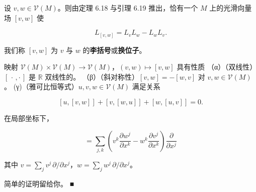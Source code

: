 设 $ v, w \in \mathcal{V}(M) $。则由定理 6.18 与引理 6.19 推出，恰有一个 $ M $ 上的光滑向量场 $ [v, w] $ 使

\begin{equation}
L_{[v, w]} = L_{v} L_{w} - L_{w} L_{v} .\tag{6.33}
\end{equation}

我们称 $ [v, w] $ 为 $ v $ 与 $ w $ 的\textbf{李括号}或\textbf{换位子}。

\begin{proposition}

\begin{subitems}
\item

映射 $ \mathcal{V}(M) \times \mathcal{V}(M) \to \mathcal{V}(M) $，$ (v, w) \mapsto [v, w] $ 具有性质
（α）（双线性）$ [\,\cdot\, , \cdot\,] $ 是 $ \mathbb{R} $ 双线性的。
（β）（斜对称性）$ [v, w] = -[w, v] $ 对 $ v, w \in \mathcal{V}(M) $。
(γ)（雅可比恒等式）$ u, v, w \in \mathcal{V}(M) $ 满足关系

\[
[u,[v,w]] + [v,[w,u]] + [w,[u,v]] = 0 .
\]
\item

在局部坐标下，

\begin{equation}
[v,w] = \sum_{j,k} \left( v^{k} \frac{\partial w^{j}}{\partial x^{k}} - w^{k} \frac{\partial v^{j}}{\partial x^{k}} \right) \frac{\partial}{\partial x^{j}}\tag{6.34}
\end{equation}

其中 $ v = \sum_{j} v^{j}\, \partial/\partial x^{j} $，$ w = \sum_{j} w^{j}\, \partial/\partial x^{j} $。

\proofhead
简单的证明留给你。 \nobreak\hspace{0.35em}■
\end{subitems}

\end{proposition}

